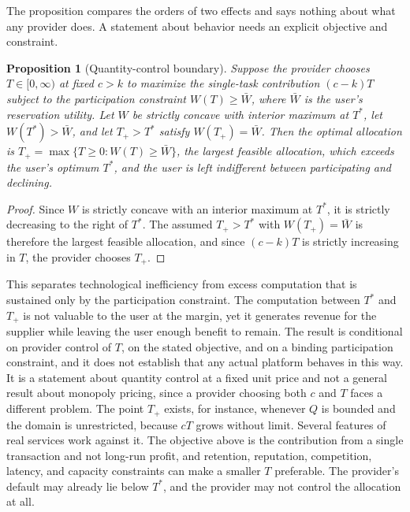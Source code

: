 \documentclass[11pt]{article}
\newtheorem{proposition}{Proposition}
\theoremstyle{remark}
\begin{document}
The proposition compares the orders of two effects and says nothing about what any provider does. A statement about behavior needs an explicit objective and constraint.

\begin{proposition}[Quantity-control boundary]\label{prop:extract}
Suppose the provider chooses $T\in[0,\infty)$ at fixed $c>k$ to maximize the single-task contribution $(c-k)T$ subject to the participation constraint $W(T)\ge\bar W$, where $\bar W$ is the user's reservation utility. Let $W$ be strictly concave with interior maximum at $T^{*}$, let $W(T^{*})>\bar W$, and let $T_{+}>T^{*}$ satisfy $W(T_{+})=\bar W$. Then the optimal allocation is $T_{+}=\max\{T\ge 0: W(T)\ge\bar W\}$, the largest feasible allocation, which exceeds the user's optimum $T^{*}$, and the user is left indifferent between participating and declining.
\end{proposition}

\begin{proof}
Since $W$ is strictly concave with an interior maximum at $T^{*}$, it is strictly decreasing to the right of $T^{*}$. The assumed $T_{+}>T^{*}$ with $W(T_{+})=\bar W$ is therefore the largest feasible allocation, and since $(c-k)T$ is strictly increasing in $T$, the provider chooses $T_{+}$.
\end{proof}

This separates technological inefficiency from excess computation that is sustained only by the participation constraint. The computation between $T^{*}$ and $T_{+}$ is not valuable to the user at the margin, yet it generates revenue for the supplier while leaving the user enough benefit to remain. The result is conditional on provider control of $T$, on the stated objective, and on a binding participation constraint, and it does not establish that any actual platform behaves in this way. It is a statement about quantity control at a fixed unit price and not a general result about monopoly pricing, since a provider choosing both $c$ and $T$ faces a different problem. The point $T_{+}$ exists, for instance, whenever $Q$ is bounded and the domain is unrestricted, because $cT$ grows without limit. Several features of real services work against it. The objective above is the contribution from a single transaction and not long-run profit, and retention, reputation, competition, latency, and capacity constraints can make a smaller $T$ preferable. The provider's default may already lie below $T^{*}$, and the provider may not control the allocation at all.
\end{document}
